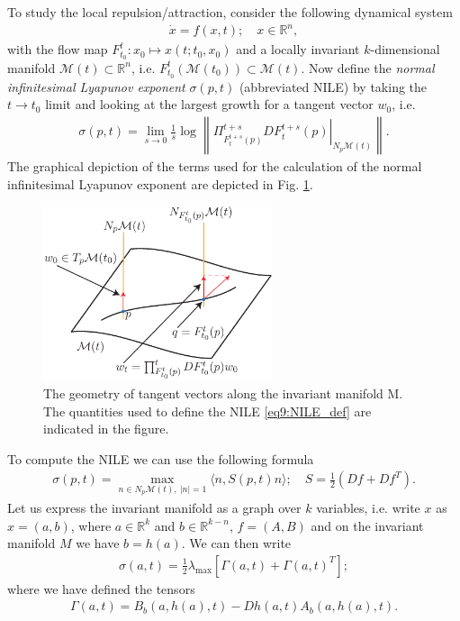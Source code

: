 To study the local repulsion/attraction, consider the following dynamical system
\begin{align}
	\dot{x}= f(x,t);\quad x \in \mathbb{R}^{n},
\end{align}
with the flow map $F_{t_0}^{t}: x_0 \mapsto x(t;t_0, x_0)$ and a locally invariant $k$-dimensional manifold $\mathcal{M}(t) \subset \mathbb{R}^{n}$, i.e. $F_{t_0}^{t}(\mathcal{M}(t_0)) \subset \mathcal{M}(t)$. Now define the \emph{normal infinitesimal Lyapunov exponent} $\sigma(p,t)$ (abbreviated NILE) by taking the $t\to t_0$ limit and looking at the largest growth for a tangent vector $w_0$, i.e.
\begin{align}
	\boxed{
		\sigma(p,t) = \lim_{s\to 0} \frac{1}{s} \log \left\| \left.\Pi_{F_{t}^{t+s}(p)}^{t+s}DF_{t}^{t+s}(p) \right|_{N_{p}\mathcal{M}(t)} \right\|. 
		} \label{eq9:NILE_def}
\end{align}
The graphical depiction of the terms used for the calculation of the normal infinitesimal Lyapunov exponent are depicted in Fig. \ref{fig:NILE_def}.
\begin{figure}[h!]
	\centering
	\includegraphics[width=0.6\textwidth]{figures/ch9/24NILE_def.pdf}
	\caption{The geometry of tangent vectors along the invariant manifold M. The quantities used to define the NILE \eqref{eq9:NILE_def} are indicated in the figure.}
	\label{fig:NILE_def}
\end{figure}

To compute the NILE we can use the following formula
\begin{align}
	\boxed{\sigma(p,t) = \max_{n\in N_{p}\mathcal{M}(t),\ |n|=1} \langle n, S(p,t)n\rangle;\quad S = \frac{1}{2}\left( Df + Df^{T}\right). }
\end{align}
Let us express the invariant manifold as a graph over $k$ variables, i.e. write $x$ as $x = (a,b)$, where $a \in \mathbb{R}^k$ and $b\in \mathbb{R}^{k-n}$, $f = (A, B)$ and on the invariant manifold $M$ we have $b = h(a)$. We can then write
\begin{align}
	\sigma(a,t) = \frac{1}{2}\lambda _{ \textrm{max} }\left[ \Gamma(a,t) + \Gamma(a,t)^{T} \right];
\end{align}
where we have defined the tensors
\begin{align}
	\Gamma(a,t)= B_{b} (a, h(a),t) - Dh(a,t) A_{b}(a, h(a),t).
\end{align}

